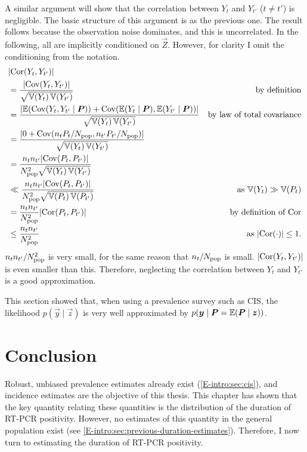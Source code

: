 \documentclass[thesis.tex]{subfiles}
\begin{document}
A similar argument will show that the correlation between $Y_t$ and $Y_{t'}$ ($t \neq t'$) is negligible.
The basic structure of this argument is as the previous one.
The result follows because the observation noise dominates, and this is uncorrelated.
In the following, all are implicitly conditioned on $\vec{Z}$.
However, for clarity I omit the conditioning from the notation.
\begin{align}
  &\lvert \operatorname{Cor}(Y_t, Y_{t'}) \rvert \\
  &= \frac{\lvert\operatorname{Cov}(Y_t, Y_{t'})\rvert}{\sqrt{\operatorname{\mathbb{V}}(Y_t) \operatorname{\mathbb{V}}(Y_{t'})}} &\text{by definition}\\
  &= \frac{\lvert \operatorname{\mathbb{E}}(\operatorname{Cov}(Y_t, Y_{t'} \mid \bm{P})) + \operatorname{Cov}(\operatorname{\mathbb{E}}(Y_t \mid \bm{P}), \operatorname{\mathbb{E}}(Y_{t'} \mid \bm{P})) \rvert}{\sqrt{\operatorname{\mathbb{V}}(Y_t) \operatorname{\mathbb{V}}(Y_{t'})}} &\text{by law of total covariance} \\
  &= \frac{\lvert 0 + \operatorname{Cov}(n_t P_t / N_\text{pop}, n_{t'} P_{t'} / N_\text{pop}) \rvert}{\sqrt{\operatorname{\mathbb{V}}(Y_t) \operatorname{\mathbb{V}}(Y_{t'})}} \\
  &= \frac{n_t n_{t'} \lvert \operatorname{Cov}(P_t, P_{t'}) \rvert}{N_\text{pop}^2 \sqrt{\operatorname{\mathbb{V}}(Y_t) \operatorname{\mathbb{V}}(Y_{t'})}}  \\
  &\ll \frac{n_t n_{t'} \lvert \operatorname{Cov}(P_t, P_{t'}) \rvert}{N_\text{pop}^2 \sqrt{\operatorname{\mathbb{V}}(P_t) \operatorname{\mathbb{V}}(P_{t'})}} &\text{as $\operatorname{\mathbb{V}}(Y_t) \gg \operatorname{\mathbb{V}}(P_t)$} \\
  &= \frac{n_t n_{t'}}{N_\text{pop}^2} \lvert \operatorname{Cor}(P_t, P_{t'}) \rvert &\text{by definition of $\operatorname{Cor}$}\\
  &\leq \frac{n_t n_{t'}}{N_\text{pop}^2} &\text{as $\lvert \operatorname{Cor}(\cdot) \rvert \leq 1$}.
\end{align}
$n_t n_{t'} / N_\text{pop}^2$ is very small, for the same reason that $n_t / N_\text{pop}$ is small.
$\lvert \operatorname{Cor}(Y_t, Y_{t'}) \rvert$ is even smaller than this.
Therefore, neglecting the correlation between $Y_t$ and $Y_{t'}$ is a good approximation.

This section showed that, when using a prevalence survey such as CIS, the likelihood $p(\vec{y} \mid \vec{z})$ is very well approximated by $p(\bm{y} \mid \bm{P} = \operatorname{\mathbb{E}}(\bm{P} \mid \bm{z}))$.


\section{Conclusion} \label{inc-prev:sec:conclusion}

Robust, unbiased prevalence estimates already exist (\cref{E-intro:sec:cis}), and incidence estimates are the objective of this thesis.
This chapter has shown that the key quantity relating these quantities is the distribution of the duration of RT-PCR positivity.
However, no estimates of this quantity in the general population exist (see \cref{E-intro:sec:previous-duration-estimates}).
Therefore, I now turn to estimating the duration of RT-PCR positivity.

\ifSubfilesClassLoaded{
  \listoftodos
}{}
\end{document}
